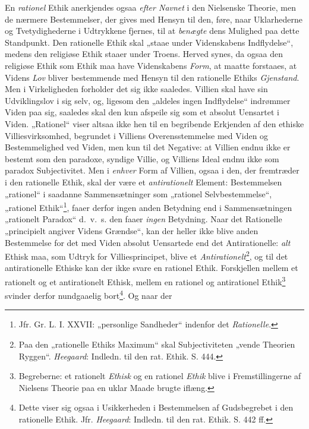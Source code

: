 \documentclass[12pt,a4paper]{book}
\newcommand{\opage}[1]{\marginnote{\footnotesize\textit{[#1]}}}
\begin{document}
En \emph{rationel} Ethik anerkjendes ogsaa \emph{efter Navnet} i den Nielsenske Theorie, men de nærmere
Bestemmelser, der gives med Hensyn til den, føre, naar Uklarhederne og Tvetydighederne i
Udtrykkene fjernes, til at \emph{benægte} dens Mulighed paa dette Standpunkt. Den rationelle Ethik
skal „staae under Videnskabens Indflydelse“, medens den religiøse Ethik staaer under Troens.
Herved synes, da ogsaa den religiøse Ethik som Ethik maa have Videnskabens \emph{Form}, at maatte
forstaaes, at Videns \emph{Lov} bliver bestemmende med Hensyn til den rationelle Ethiks \emph{Gjenstand}.
Men i Virkeligheden forholder det sig ikke saaledes. Villien skal have sin Udviklingslov i sig
selv, og, ligesom den „aldeles ingen Indflydelse“ indrømmer Viden paa sig, saaledes skal \opage{198}den
kun afspeile sig som et absolut Uensartet i Viden. „Rationel“ viser altsaa ikke hen til en
begribende Erkjenden af den ethiske Villiesvirksomhed, begrundet i Villiens Overensstemmelse
med Viden og Bestemmelighed ved Viden, men kun til det Negative: at Villien endnu ikke er
bestemt som den paradoxe, syndige Villie, og Villiens Ideal endnu ikke som paradox
Subjectivitet. Men i \emph{enhver} Form af Villien, ogsaa i den, der fremtræder i den
rationelle Ethik, skal der være et \emph{antirationelt} Element: Bestemmelsen „rationel“ i
saadanne Sammensætninger som „rationel Selvbestemmelse“, „rationel Ethik“\footnote{Jfr. Gr. L.
I. XXVII: „personlige Sandheder“ indenfor det \emph{Rationelle}.}, faaer derfor ingen anden Betydning
end i Sammensætningen „rationelt Paradox“ d.\ v.\ s. den faaer \emph{ingen} Betydning. Naar
det Rationelle „principielt angiver Videns Grændse“, kan der heller ikke blive anden
Bestemmelse for det med Viden absolut Uensartede end det Antirationelle: \emph{alt} Ethisk maa, som
Udtryk for Villiesprincipet, blive et \emph{Antirationelt}\footnote{Paa den „rationelle Ethiks
Maximum“ skal Subjectiviteten „vende Theorien Ryggen“. \emph{Heegaard}: Indledn. til den rat. Ethik.
S. 444.}, og til det antirationelle Ethiske kan der ikke svare en rationel Ethik. Forskjellen
mellem et rationelt og et antirationelt Ethisk, mellem en rationel og antirationel
Ethik\footnote{Begreberne: et rationelt \emph{Ethisk} og en rationel \emph{Ethik} blive i Fremstillingerne
af Nielsens Theorie paa en uklar Maade brugte iflæng.} svinder derfor nundgaaelig
bort\footnote{Dette viser sig ogsaa i Usikkerheden i Bestemmelsen af Gudsbegrebet i den
rationelle Ethik. Jfr. \emph{Heegaard}: Indledn. til den rat. Ethik. S. 442 ff.}. Og naar der
\end{document}
